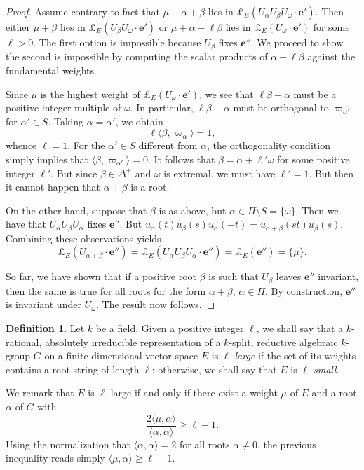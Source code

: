\documentclass{amsart}
\theoremstyle{plain}
\theoremstyle{definition}
\newtheorem{definition}[theorem]{Definition}
\theoremstyle{remark}
\newcommand{\Vect}[1]{\mathbold{#1}}
\begin{document}
\begin{proof}
Assume contrary to fact that $\mu + \alpha + \beta$ lies in
$\pounds_{E} (U_{\alpha} U_{\beta} U_{\omega} \cdot \Vect{e}')$.
Then either $\mu + \beta$ lies in $\pounds_{E} (U_{\beta}
U_{\omega} \cdot \Vect{e}')$ or $\mu + \alpha - \ell \beta$ lies
in $\pounds_{E}(U_{\omega} \cdot \Vect{e}')$ for some $\ell > 0$.
The first option is impossible because $U_{\beta}$ fixes
$\Vect{e}''$. We proceed to show the second is impossible by
computing the scalar products of $\alpha - \ell \beta$ against the
fundamental weights.

Since $\mu$ is the highest weight of $\pounds_{E}(U_{\omega} \cdot
\Vect{e}')$, we see that $\ell \beta - \alpha$ must be a positive
integer multiple of $\omega$. In particular, $\ell \beta - \alpha$
must be orthogonal to $\varpi_{\alpha'}$ for $\alpha' \in S$.
Taking $\alpha = \alpha'$, we obtain
$$\ell \langle \beta, \varpi_{\alpha} \rangle= 1,$$
whence $\ell = 1$. For the $\alpha' \in S$ different from
$\alpha$, the orthogonality condition simply implies that $\langle
\beta, \varpi_{\alpha'} \rangle = 0$. It follows that $\beta =
\alpha + \ell' \omega$ for some positive integer $\ell'$. But
since $\beta \in \Delta^{+}$ and $\omega$ is extremal, we must
have $\ell' = 1$. But then it cannot happen that $\alpha + \beta$
is a root.

On the other hand, suppose that $\beta$ is as above, but $\alpha \in \Pi \setminus S = \{\omega\}$.
Then we have that $U_{\alpha}U_{\beta}U_{\alpha}$ fixes $\Vect{e}''$. But
$u_{\alpha}(t)u_{\beta}(s)u_{\alpha}(-t) = u_{\alpha + \beta}(st)u_{\beta}(s)$.
Combining these observations yields
$$\pounds_{E}(U_{\alpha + \beta} \cdot \Vect{e}'') = \pounds_{E}(U_{\alpha}U_{\beta}U_{\alpha} \cdot
\Vect{e}'') = \pounds_{E}(\Vect{e}'') = \{\mu\}.$$

So far, we have shown that if a positive root $\beta$ is such that $U_{\beta}$ leaves
$\Vect{e}''$ invariant, then the same is true for all roots for the form $\alpha +
\beta$, $\alpha \in \Pi$. By construction, $\Vect{e}''$
is invariant under $U_{\omega}$.
The result now follows.
\end{proof}

\begin{definition}
Let $k$ be a field. Given a positive integer $\ell$,
we shall say that a $k$-rational, absolutely irreducible representation of a $k$-split,
reductive algebraic $k$-group $G$ on a finite-dimensional vector space $E$ is
\emph{$\ell$-large}
if the set of its weights contains a root string of length $\ell$;
otherwise, we shall say that $E$ is \emph{$\ell$-small}.
\end{definition}
\noindent We remark that $E$ is $\ell$-large if and only
if there exist a weight $\mu$ of $E$ and a root $\alpha$ of $G$ with
$$\frac{2 \langle \mu, \alpha \rangle}{\langle \alpha, \alpha \rangle} \geqslant \ell - 1.$$
Using the normalization that $\langle \alpha, \alpha \rangle = 2$ for all roots $\alpha
\neq 0$, the previous inequality reads simply $\langle \mu, \alpha \rangle \geqslant \ell -
1$.
\end{document}
